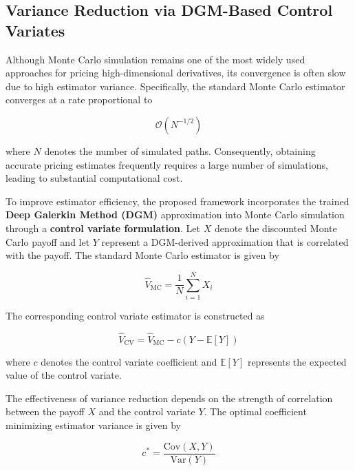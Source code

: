 \documentclass[12pt, a4paper]{article}
\begin{document}
\subsection{Variance Reduction via DGM-Based Control Variates}

Although Monte Carlo simulation remains one of the most widely used
approaches for pricing high-dimensional derivatives, its convergence is
often slow due to high estimator variance. Specifically, the standard
Monte Carlo estimator converges at a rate proportional to

\begin{equation}
    \mathcal{O}(N^{-1/2})
    \label{eq:mc_convergence}
\end{equation}

where $N$ denotes the number of simulated paths. Consequently, obtaining
accurate pricing estimates frequently requires a large number of
simulations, leading to substantial computational cost.

To improve estimator efficiency, the proposed framework incorporates the
trained \textbf{Deep Galerkin Method (DGM)} approximation into Monte
Carlo simulation through a \textbf{control variate formulation}. Let
$X$ denote the discounted Monte Carlo payoff and let $Y$ represent a
DGM-derived approximation that is correlated with the payoff. The
standard Monte Carlo estimator is given by

\begin{equation}
    \hat{V}_{\mathrm{MC}} = \frac{1}{N}\sum_{i=1}^{N} X_i
    \label{eq:mc_estimator}
\end{equation}

The corresponding control variate estimator is constructed as

\begin{equation}
    \hat{V}_{\mathrm{CV}} = \hat{V}_{\mathrm{MC}}
    - c\left(Y - \mathbb{E}[Y]\right)
    \label{eq:cv_estimator}
\end{equation}

where $c$ denotes the control variate coefficient and $\mathbb{E}[Y]$
represents the expected value of the control variate.

The effectiveness of variance reduction depends on the strength of
correlation between the payoff $X$ and the control variate $Y$. The
optimal coefficient minimizing estimator variance is given by

\begin{equation}
    c^* = \frac{\mathrm{Cov}(X,Y)}{\mathrm{Var}(Y)}
    \label{eq:opt_coeff}
\end{equation}
\end{document}
